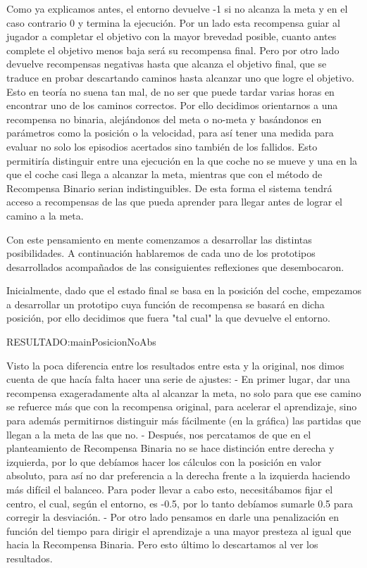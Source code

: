 Como ya explicamos antes, el entorno devuelve -1 si no alcanza la meta y en el caso contrario 0 y termina la ejecución. 
Por un lado esta recompensa guiar al jugador a completar el objetivo con la mayor brevedad posible, cuanto antes complete el objetivo menos baja será su recompensa final.
Pero por otro lado devuelve recompensas negativas hasta que alcanza el objetivo final, que se traduce en probar descartando caminos hasta alcanzar uno que logre el objetivo. Esto en teoría no suena tan mal, de no ser que puede tardar varias horas en encontrar uno de los caminos correctos. Por ello decidimos orientarnos a una recompensa no binaria, alejándonos del meta o no-meta y basándonos en parámetros como la posición o la velocidad, para así tener una medida para evaluar no solo los episodios acertados sino también de los fallidos. Esto permitiría distinguir entre una ejecución en la que coche no se mueve y una en la que el coche casi llega a alcanzar la meta, mientras que con el método de Recompensa Binario serian indistinguibles. De esta forma el sistema tendrá acceso a recompensas de las que pueda aprender para llegar antes de lograr el camino a la meta. 

Con este pensamiento en mente comenzamos a desarrollar las distintas posibilidades. A continuación hablaremos de cada uno de los prototipos desarrollados acompañados de las consiguientes reflexiones que desembocaron.
 
Inicialmente, dado que el estado final se basa en la posición del coche, empezamos a desarrollar un prototipo cuya función de recompensa se basará en dicha posición, por ello decidimos que fuera "tal cual" la que devuelve el entorno. 

 RESULTADO:mainPosicionNoAbs

Visto la poca diferencia entre los resultados entre esta y la original, nos dimos cuenta de que hacía falta hacer una serie de ajustes:
- En primer lugar, dar una recompensa exageradamente alta al alcanzar la meta, no solo para que ese camino se refuerce más que con la recompensa original, para acelerar el aprendizaje, sino para además permitirnos distinguir más fácilmente (en la gráfica) las partidas que llegan a la meta de las que no.  
- Después, nos percatamos de que en el planteamiento de Recompensa Binaria no se hace distinción entre derecha y izquierda, por lo que debíamos hacer los cálculos con la posición en valor absoluto, para así no dar preferencia a la derecha frente a la izquierda haciendo más difícil el balanceo.
Para poder llevar a cabo esto, necesitábamos fijar el centro, el cual, según el entorno, es -0.5, por lo tanto debíamos sumarle 0.5 para corregir la desviación.
- Por otro lado pensamos en darle una penalización en función del tiempo para dirigir el aprendizaje a una mayor presteza al igual que hacia la Recompensa Binaria. Pero esto último lo descartamos al ver los resultados.

